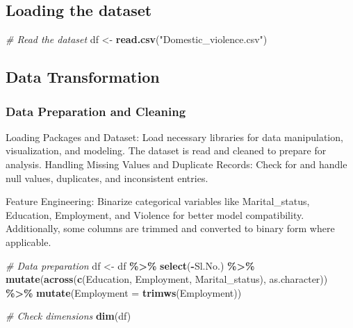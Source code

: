 \documentclass[
]{article}
\newenvironment{Shaded}{\begin{snugshade}}{\end{snugshade}}
\newcommand{\AttributeTok}[1]{\textcolor[rgb]{0.13,0.29,0.53}{#1}}
\newcommand{\CommentTok}[1]{\textcolor[rgb]{0.56,0.35,0.01}{\textit{#1}}}
\newcommand{\FunctionTok}[1]{\textcolor[rgb]{0.13,0.29,0.53}{\textbf{#1}}}
\newcommand{\NormalTok}[1]{#1}
\newcommand{\OtherTok}[1]{\textcolor[rgb]{0.56,0.35,0.01}{#1}}
\newcommand{\SpecialCharTok}[1]{\textcolor[rgb]{0.81,0.36,0.00}{\textbf{#1}}}
\newcommand{\StringTok}[1]{\textcolor[rgb]{0.31,0.60,0.02}{#1}}
\begin{document}
\hypertarget{loading-the-dataset}{%
\subsection{Loading the dataset}\label{loading-the-dataset}}

\begin{Shaded}
\begin{Highlighting}[]
\CommentTok{\# Read the dataset}
\NormalTok{df }\OtherTok{\textless{}{-}} \FunctionTok{read.csv}\NormalTok{(}\StringTok{"Domestic\_violence.csv"}\NormalTok{)}
\end{Highlighting}
\end{Shaded}

\hypertarget{data-transformation}{%
\subsection{Data Transformation}\label{data-transformation}}

\hypertarget{data-preparation-and-cleaning}{%
\subsubsection{Data Preparation and
Cleaning}\label{data-preparation-and-cleaning}}

Loading Packages and Dataset: Load necessary libraries for data
manipulation, visualization, and modeling. The dataset is read and
cleaned to prepare for analysis. Handling Missing Values and Duplicate
Records: Check for and handle null values, duplicates, and inconsistent
entries.

Feature Engineering: Binarize categorical variables like
Marital\_status, Education, Employment, and Violence for better model
compatibility. Additionally, some columns are trimmed and converted to
binary form where applicable.

\begin{Shaded}
\begin{Highlighting}[]
\CommentTok{\# Data preparation}
\NormalTok{df }\OtherTok{\textless{}{-}}\NormalTok{ df }\SpecialCharTok{\%\textgreater{}\%} 
  \FunctionTok{select}\NormalTok{(}\SpecialCharTok{{-}}\StringTok{\textquotesingle{}Sl.No.\textquotesingle{}}\NormalTok{) }\SpecialCharTok{\%\textgreater{}\%}
  \FunctionTok{mutate}\NormalTok{(}\FunctionTok{across}\NormalTok{(}\FunctionTok{c}\NormalTok{(}\StringTok{\textquotesingle{}Education\textquotesingle{}}\NormalTok{, }\StringTok{\textquotesingle{}Employment\textquotesingle{}}\NormalTok{, }\StringTok{\textquotesingle{}Marital\_status\textquotesingle{}}\NormalTok{), as.character)) }\SpecialCharTok{\%\textgreater{}\%}
  \FunctionTok{mutate}\NormalTok{(}\AttributeTok{Employment =} \FunctionTok{trimws}\NormalTok{(Employment))}

\CommentTok{\# Check dimensions}
\FunctionTok{dim}\NormalTok{(df)}
\end{Highlighting}
\end{Shaded}
\end{document}
